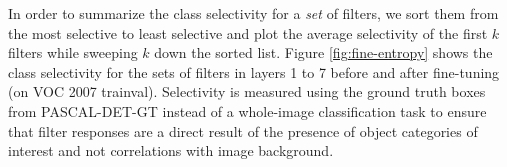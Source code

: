 In order to summarize the class selectivity for a \emph{set} of filters, we sort them from the most selective to least selective and plot the average selectivity of the first $k$ filters while sweeping $k$ down the sorted list.
Figure \ref{fig:fine-entropy} shows the class selectivity for the sets of filters in layers 1 to 7 before and after fine-tuning (on VOC 2007 trainval).
Selectivity is measured using the ground truth boxes from PASCAL-DET-GT instead of a whole-image classification task to ensure that filter responses are a direct result of the presence of object categories of interest and not correlations with image background.


